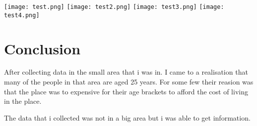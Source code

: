\documentclass{article}
\begin{document}
\texttt{[image: test.png]}
\texttt{[image: test2.png]}
\texttt{[image: test3.png]}
\texttt{[image: test4.png]}



\section{Conclusion}
After collecting data in the small area that i was in. I came to a realisation that many of the people in that area are aged 25 years. For some few their reasion was that the place was to expensive for their age brackets to afford the cost of living in the place.

The data that i collected was not in a big area but i was able to get information.
\end{document}
